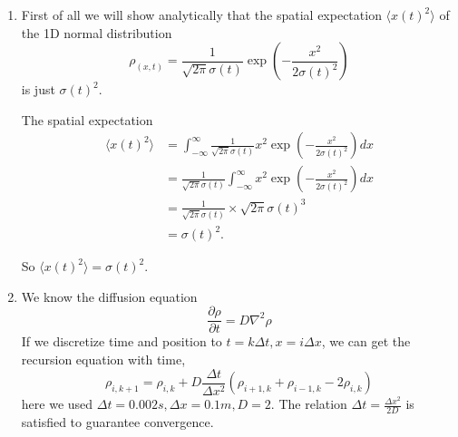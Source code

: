 \documentclass[aps,prl,preprint,superscriptaddress]{revtex4}
\begin{document}
\begin{enumerate}
\item First of all we will show analytically that the spatial expectation $\langle x(t)^2\rangle$ of the 1D normal distribution 
\begin{equation}
\rho_{(x,t)}=\frac{1}{\sqrt{2\pi}\sigma{(t)}}\exp(-\frac{x^2}{2\sigma{(t)}^2})
\end{equation}
is just $\sigma(t)^2$.

The spatial expectation
\begin{equation}
\begin{split}
\langle x(t)^2\rangle&=\int_{-\infty}^{\infty}\frac{1}{\sqrt{2\pi}\sigma(t)}x^2\exp(-\frac{x^2}{2\sigma(t)^2})dx\\
&=\frac{1}{\sqrt{2\pi}\sigma(t)}\int_{-\infty}^{\infty}x^2\exp(-\frac{x^2}{2\sigma(t)^2})dx\\
&=\frac{1}{\sqrt{2\pi}\sigma(t)}\times \sqrt{2\pi}\sigma(t)^3\\
&=\sigma(t)^2.
\end{split}
\end{equation}

So $\langle x(t)^2\rangle=\sigma(t)^2$.
\item We know the diffusion equation
\begin{equation}
\frac{\partial\rho}{\partial t}=D\nabla^2\rho
\end{equation}
If we discretize time and position to $t=k\Delta t, x=i\Delta x$, we can get the recursion equation with time, 
\begin{equation}
\rho_{i,k+1}=\rho_{i,k}+D\frac{\Delta t}{\Delta x^2}(\rho_{i+1,k}+\rho_{i-1,k}-2\rho_{i,k})
\end{equation}
here we used $\Delta t=0.002s, \Delta x=0.1m, D=2$. The relation $\Delta t=\frac{\Delta x^2}{2D}$ is satisfied to guarantee convergence.


\end{enumerate}
\end{document}
